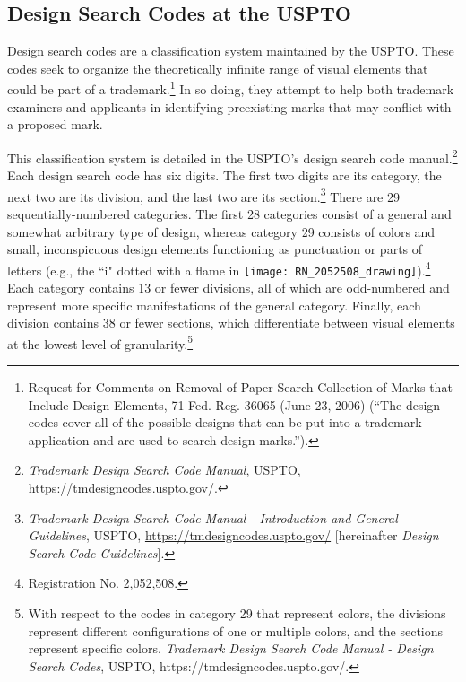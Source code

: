 \documentclass[letterpaper, 11pt, oneside]{article}
\begin{document}
\subsection{Design Search Codes at the USPTO}\label{subsec:1C}

Design search codes are a classification system maintained by the USPTO. These codes seek to organize the theoretically infinite range of visual elements that could be part of a trademark.\footnote{\label{supra14} Request for Comments on Removal of Paper Search Collection of Marks that Include Design Elements, 71 Fed. Reg. 36065 (June 23, 2006) (``The design codes cover all of the possible designs that can be put into a trademark application and are used to search design marks.'').} In so doing, they attempt to help both trademark examiners and applicants in identifying preexisting marks that may conflict with a proposed mark.

This classification system is detailed in the USPTO's design search code manual.\footnote{\textit{Trademark Design Search Code Manual}, USPTO, https://tmdesigncodes.uspto.gov/.} Each design search code has six digits. The first two digits are its category, the next two are its division, and the last two are its section.\footnote{\label{supra15} \textit{Trademark Design Search Code Manual - Introduction and General Guidelines}, USPTO, \url{https://tmdesigncodes.uspto.gov/} [hereinafter \textit{Design Search Code Guidelines}].} There are 29 sequentially-numbered categories. The first 28 categories consist of a general and somewhat arbitrary type of design, whereas category 29 consists of colors and small, inconspicuous design elements functioning as punctuation or parts of letters (e.g., the ``i" dotted with a flame in \texttt{[image: RN\_2052508\_drawing]}).\footnote{Registration No. 2,052,508.} Each category contains 13 or fewer divisions, all of which are odd-numbered and represent more specific manifestations of the general category. Finally, each division contains 38 or fewer sections, which differentiate between visual elements at the lowest level of granularity.\footnote{With respect to the codes in category 29 that represent colors, the divisions represent different configurations of one or multiple colors, and the sections represent specific colors. \textit{Trademark Design Search Code Manual - Design Search Codes}, USPTO, https://tmdesigncodes.uspto.gov/.}
\end{document}
